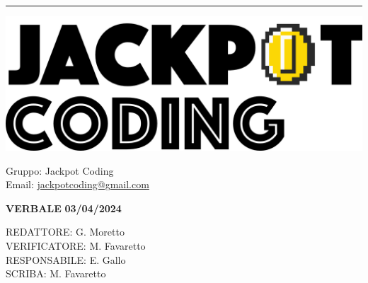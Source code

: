 \documentclass[5pt]{article}
\begin{document}
\hrule
\begin{minipage}[t]{0.50\textwidth}
    \begin{flushleft}
        \hspace{10pt}
        \includegraphics[scale=0.65]{jackpot-logo.png} 
    \end{flushleft}
\end{minipage}
\hspace{-60pt} %
\begin{flushright}
    \begin{minipage}[t]{0.50\textwidth}
        \begin{flushright}
            Gruppo: {\Large Jackpot Coding}\\
            Email: \href{mailto:jackpotcoding@gmail.com}{jackpotcoding@gmail.com}
        \end{flushright}
    \end{minipage}
\end{flushright}

\vspace{15pt}

\begin{center}
    \textbf{\large VERBALE }
    \textbf{\large 03/04/2024} \\
    \textbf{\Large}
\end{center}

\vspace{13pt}

\begin{flushleft}
    \begin{spacing}{1.5}
        REDATTORE:  G. Moretto\\
        VERIFICATORE:  M. Favaretto\\%
        RESPONSABILE: E. Gallo\\%
        \vspace{7pt}
        SCRIBA: M. Favaretto\\%
    \end{spacing}
\end{flushleft}
\end{document}
